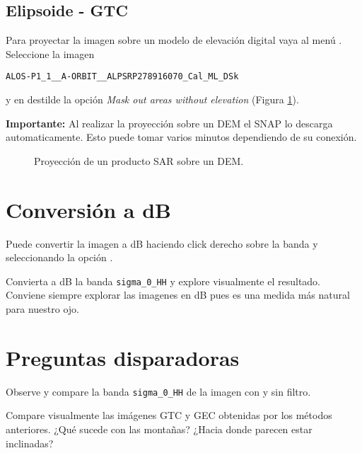 \subsection{Elipsoide - GTC}

Para proyectar la imagen sobre un modelo de elevación digital vaya al menú . Seleccione la imagen
\begin{center} \texttt{ALOS-P1\_1\_\_A-ORBIT\_\_ALPSRP278916070\_Cal\_ML\_DSk}
  \end{center}
  y en  destilde la opción \emph{Mask out areas without elevation} (Figura \ref{fig:gtc}).

{\bf Importante:} Al realizar la proyección sobre un DEM el SNAP lo descarga automaticamente. Esto puede tomar varios minutos dependiendo de su conexión.

\begin{figure}[h!]
    \centering
    \hspace{1cm}
    \caption{Proyección de un producto SAR sobre un DEM.}
    \label{fig:gtc}
\end{figure}

\section{Conversión a dB}

Puede convertir la imagen a dB haciendo click derecho sobre la banda y seleccionando la opción .

Convierta a dB la banda \texttt{sigma\_0\_HH} y explore visualmente el resultado. Conviene siempre explorar las imagenes en dB pues es una medida más natural para nuestro ojo.

\section{Preguntas disparadoras}

\begin{que}
    Observe y compare la banda \texttt{sigma\_0\_HH} de la imagen con y sin filtro.
\end{que}

\begin{que}
    Compare visualmente las imágenes GTC y GEC obtenidas por los métodos anteriores. ¿Qué sucede con las montañas? ¿Hacia donde parecen estar inclinadas?
\end{que}

